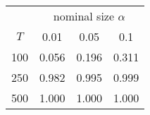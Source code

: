 % 
\begin{tabular}{cccc}
  \hline
  & \multicolumn{3}{c}{nominal size $\alpha$} \\
 $T$ & 0.01 & 0.05 & 0.1 \\
 \hline
100 & 0.056 & 0.196 & 0.311 \\ 
  250 & 0.982 & 0.995 & 0.999 \\ 
  500 & 1.000 & 1.000 & 1.000 \\ 
   \hline
\end{tabular}
